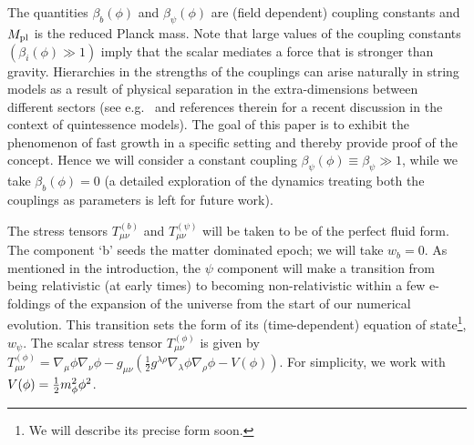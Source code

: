 \documentclass[a4paper, amsfonts, amssymb, amsmath, reprint, showkeys, nofootinbib, twoside, superscriptaddress]{revtex4-1}
\begin{document}
The quantities $\beta_{b}(\phi)$ and $\beta_{\psi}(\phi)$ are  (field dependent) coupling constants and $M_{\rm pl}$ is the reduced Planck mass. Note that large values of the coupling constants $(\beta_{i}(\phi) \gg 1)$ imply that the scalar mediates a force that is stronger than gravity. Hierarchies in the strengths of the couplings can arise naturally in string models as a result of physical separation in the extra-dimensions between different sectors (see e.g.~\cite{Acharya:2018deu} and references therein for a recent discussion in the context of quintessence models). The goal of this paper is to exhibit the phenomenon of fast growth in a specific setting and thereby provide proof of the concept. Hence we will consider a constant coupling $\beta_\psi(\phi) \equiv \beta_\psi \gg 1$, while we take $\beta_b(\phi) = 0$ (a detailed exploration of the dynamics treating both the couplings as parameters is left for future work).

The stress tensors $T_{\mu \nu}^{(b)}$ and $T_{\mu \nu}^{(\psi)}$ will be taken to be of the perfect fluid form. The component `b' seeds the matter dominated epoch; we will take $w_b =0$. As mentioned in the introduction, the $\psi$ component will make a transition from being relativistic (at early times) to becoming non-relativistic within a few e-foldings of the expansion of the universe from the start of our numerical evolution. This transition sets the form of its (time-dependent) equation of state\footnote{We will describe its precise form soon.}, $w_{\psi}$. The scalar stress tensor $T^{(\phi)}_{\mu \nu}$ is given by $T^{(\phi)}_{\mu \nu} = \nabla_\mu \phi \nabla_\nu \phi - g_{\mu \nu} \left(\frac{1}{2} g^{\lambda \rho} \nabla_\lambda \phi \nabla_\rho \phi - V(\phi)\right)$. For simplicity, we work with $V(\phi) = {1 \over 2} m_\phi^{2} \phi^{2}$.

\end{document}
